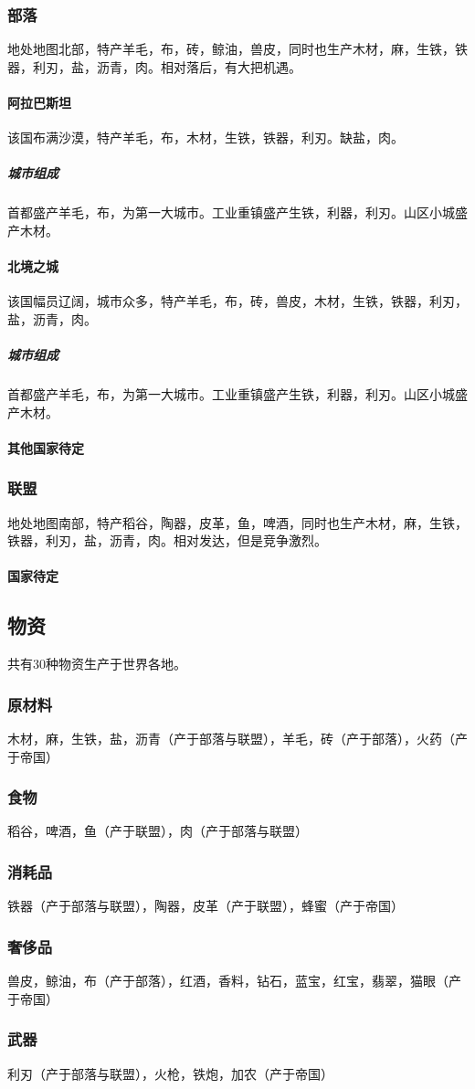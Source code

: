 \documentclass[UTF8]{ctexart}
\begin{document}
\subsubsection{部落}
地处地图北部，特产羊毛，布，砖，鲸油，兽皮，同时也生产木材，麻，生铁，铁器，利刃，盐，沥青，肉。相对落后，有大把机遇。

\paragraph{阿拉巴斯坦}
该国布满沙漠，特产羊毛，布，木材，生铁，铁器，利刃。缺盐，肉。
\subparagraph{城市组成}
首都盛产羊毛，布，为第一大城市。工业重镇盛产生铁，利器，利刃。山区小城盛产木材。

\paragraph{北境之城}
该国幅员辽阔，城市众多，特产羊毛，布，砖，兽皮，木材，生铁，铁器，利刃，盐，沥青，肉。 
\subparagraph{城市组成}
首都盛产羊毛，布，为第一大城市。工业重镇盛产生铁，利器，利刃。山区小城盛产木材。


\paragraph{其他国家待定}

\subsubsection{联盟}
地处地图南部，特产稻谷，陶器，皮革，鱼，啤酒，同时也生产木材，麻，生铁，铁器，利刃，盐，沥青，肉。相对发达，但是竞争激烈。

\paragraph{国家待定}

\subsection{物资}
共有30种物资生产于世界各地。

\subsubsection{原材料}
木材，麻，生铁，盐，沥青（产于部落与联盟），羊毛，砖（产于部落），火药（产于帝国）
\subsubsection{食物}
稻谷，啤酒，鱼（产于联盟），肉（产于部落与联盟）
\subsubsection{消耗品}
铁器（产于部落与联盟），陶器，皮革（产于联盟），蜂蜜（产于帝国）
\subsubsection{奢侈品}
兽皮，鲸油，布（产于部落），红酒，香料，钻石，蓝宝，红宝，翡翠，猫眼（产于帝国）
\subsubsection{武器}
利刃（产于部落与联盟），火枪，铁炮，加农（产于帝国）
\end{document}
